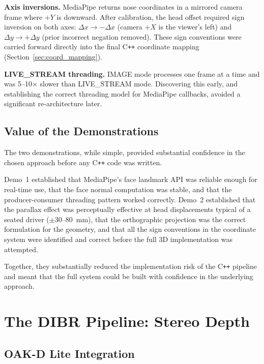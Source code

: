 \documentclass[11pt, a4paper]{report}
\begin{document}
\textbf{Axis inversions.}
MediaPipe returns nose coordinates in a mirrored camera frame where $+Y$
is downward.
After calibration, the head offset required sign inversion on both axes:
$\Delta x \to -\Delta x$ (camera $+X$ is the viewer's left) and
$\Delta y \to +\Delta y$ (prior incorrect negation removed).
These sign conventions were carried forward directly into the final
C\texttt{++} coordinate mapping (Section~\ref{sec:coord_mapping}).

\textbf{LIVE\_STREAM threading.}
IMAGE mode processes one frame at a time and was 5--10$\times$ slower
than LIVE\_STREAM mode.
Discovering this early, and establishing the correct threading model for
MediaPipe callbacks, avoided a significant re-architecture later.

\section{Value of the Demonstrations}

The two demonstrations, while simple, provided substantial confidence in
the chosen approach before any C\texttt{++} code was written.

Demo~1 established that MediaPipe's face landmark API was reliable enough
for real-time use, that the face normal computation was stable, and that
the producer-consumer threading pattern worked correctly.
Demo~2 established that the parallax effect was perceptually effective at
head displacements typical of a seated driver ($\pm$30--80~mm), that the
orthographic projection was the correct formulation for the geometry, and
that all the sign conventions in the coordinate system were identified and
correct before the full 3D implementation was attempted.

Together, they substantially reduced the implementation risk of the
C\texttt{++} pipeline and meant that the full system could be built with
confidence in the underlying approach.

\chapter{The DIBR Pipeline: Stereo Depth}

\section{OAK-D Lite Integration}
\end{document}
